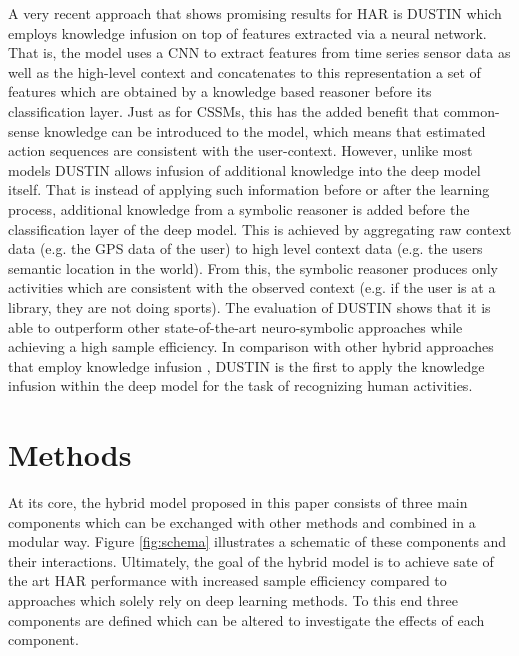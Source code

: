 \documentclass[11pt,titlepage,oneside,openany]{book}
\begin{document}
A very recent approach that shows promising results for HAR is DUSTIN \cite{arrotta_knowledge_2022} which employs knowledge infusion on top of features extracted via a neural network. That is, the model uses a CNN to extract features from time series sensor data as well as the high-level context and concatenates to this representation a set of features which are obtained by a knowledge based reasoner before its classification layer. Just as for CSSMs, this has the added benefit that common-sense knowledge can be introduced to the model, which means that estimated action sequences are consistent with the user-context. However, unlike most models DUSTIN allows infusion of additional knowledge into the deep model itself. That is instead of applying such information before or after the learning process, additional knowledge from a symbolic reasoner is added before the classification layer of the deep model. This is achieved by aggregating raw context data (e.g. the GPS data of the user) to high level context data (e.g. the users semantic location in the world). From this, the symbolic reasoner produces only activities which are consistent with the observed context (e.g. if the user is at a library, they are not doing sports). The evaluation of DUSTIN shows that it is able to outperform other state-of-the-art neuro-symbolic approaches while achieving a high sample efficiency. In comparison with other hybrid approaches that employ knowledge infusion \cite{bettini_caviar_2020, sukor_hybrid_2019}, DUSTIN is the first to apply the knowledge infusion within the deep model for the task of recognizing human activities.


\chapter{Methods}
\label{cha:alg}

At its core, the hybrid model proposed in this paper consists of three main components which can be exchanged with other methods and combined in a modular way. Figure \ref{fig:schema} illustrates a schematic of these components and their interactions. Ultimately, the goal of the hybrid model is to achieve sate of the art HAR performance with increased sample efficiency compared to approaches which solely rely on deep learning methods. To this end three components are defined which can be altered to investigate the effects of each component.
\end{document}
